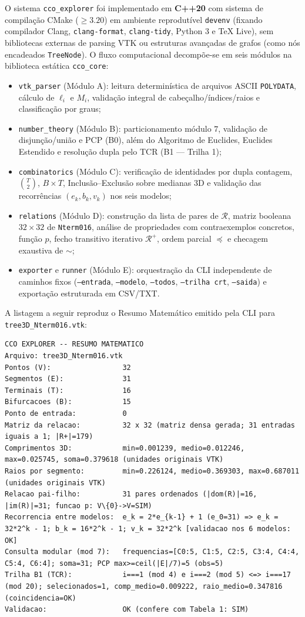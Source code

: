 \documentclass[11pt, a4paper]{article}
\begin{document}
O sistema \texttt{cco\_explorer} foi implementado em \textbf{C++20} com sistema de compilação CMake ($\ge 3.20$) em ambiente reprodutível \texttt{devenv} (fixando compilador Clang, \texttt{clang-format}, \texttt{clang-tidy}, Python 3 e TeX Live), sem bibliotecas externas de parsing VTK ou estruturas avançadas de grafos (como nós encadeados \texttt{TreeNode}). O fluxo computacional decompõe-se em seis módulos na biblioteca estática \texttt{cco\_core}:
\begin{itemize}[leftmargin=*]
  \item \texttt{vtk\_parser} (Módulo A): leitura determinística de arquivos ASCII \texttt{POLYDATA}, cálculo de $\ell_i$ e $M_i$, validação integral de cabeçalho/índices/raios e classificação por graus;
  \item \texttt{number\_theory} (Módulo B): particionamento módulo $7$, validação de disjunção/união e PCP (B0), além do Algoritmo de Euclides, Euclides Estendido e resolução dupla pelo TCR (B1 --- Trilha 1);
  \item \texttt{combinatorics} (Módulo C): verificação de identidades por dupla contagem, $\binom{T}{2}$, $B\times T$, Inclusão--Exclusão sobre medianas 3D e validação das recorrências $(e_k, b_k, v_k)$ nos seis modelos;
  \item \texttt{relations} (Módulo D): construção da lista de pares de $\mathcal{R}$, matriz booleana $32\times 32$ de \texttt{Nterm016}, análise de propriedades com contraexemplos concretos, função $p$, fecho transitivo iterativo $\mathcal{R}^+$, ordem parcial $\preceq$ e checagem exaustiva de $\sim$;
  \item \texttt{exporter} e \texttt{runner} (Módulo E): orquestração da CLI independente de caminhos fixos (\texttt{--entrada}, \texttt{--modelo}, \texttt{--todos}, \texttt{--trilha crt}, \texttt{--saida}) e exportação estruturada em CSV/TXT.
\end{itemize}

A listagem a seguir reproduz o Resumo Matemático emitido pela CLI para \texttt{tree3D\_Nterm016.vtk}:
\begin{lstlisting}
CCO EXPLORER -- RESUMO MATEMATICO
Arquivo: tree3D_Nterm016.vtk
Pontos (V):                 32
Segmentos (E):              31
Terminais (T):              16
Bifurcacoes (B):            15
Ponto de entrada:           0
Matriz da relacao:          32 x 32 (matriz densa gerada; 31 entradas iguais a 1; |R+|=179)
Comprimentos 3D:            min=0.001239, medio=0.012246, max=0.025745, soma=0.379618 (unidades originais VTK)
Raios por segmento:         min=0.226124, medio=0.369303, max=0.687011 (unidades originais VTK)
Relacao pai-filho:          31 pares ordenados (|dom(R)|=16, |im(R)|=31; funcao p: V\{0}->V=SIM)
Recorrencia entre modelos:  e_k = 2*e_{k-1} + 1 (e_0=31) => e_k = 32*2^k - 1; b_k = 16*2^k - 1; v_k = 32*2^k [validacao nos 6 modelos: OK]
Consulta modular (mod 7):   frequencias=[C0:5, C1:5, C2:5, C3:4, C4:4, C5:4, C6:4]; soma=31; PCP max>=ceil(|E|/7)=5 (obs=5)
Trilha B1 (TCR):            i===1 (mod 4) e i===2 (mod 5) <=> i===17 (mod 20); selecionados=1, comp_medio=0.009222, raio_medio=0.347816 (coincidencia=OK)
Validacao:                  OK (confere com Tabela 1: SIM)
\end{lstlisting}
\end{document}
